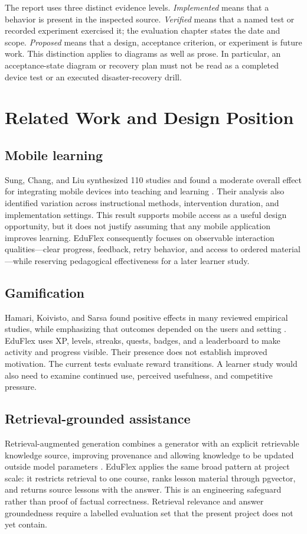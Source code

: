 \documentclass[12pt,a4paper,oneside]{report}
\begin{document}
The report uses three distinct evidence levels. \emph{Implemented} means that a
behavior is present in the inspected source. \emph{Verified} means that a named test
or recorded experiment exercised it; the evaluation chapter states the date and
scope. \emph{Proposed} means that a design, acceptance criterion, or experiment is
future work. This distinction applies to diagrams as well as prose. In particular,
an acceptance-state diagram or recovery plan must not be read as a completed device
test or an executed disaster-recovery drill.

\chapter{Related Work and Design Position}
\section{Mobile learning}
Sung, Chang, and Liu synthesized 110 studies and found a moderate overall effect for
integrating mobile devices into teaching and learning \cite{sung2016}. Their analysis
also identified variation across instructional methods, intervention duration, and
implementation settings. This result supports mobile access as a useful design
opportunity, but it does not justify assuming that any mobile application improves
learning. EduFlex consequently focuses on observable interaction qualities---clear
progress, feedback, retry behavior, and access to ordered material---while reserving
pedagogical effectiveness for a later learner study.

\section{Gamification}
Hamari, Koivisto, and Sarsa found positive effects in many reviewed empirical studies,
while emphasizing that outcomes depended on the users and setting
\cite{hamari2014}. EduFlex uses XP, levels, streaks, quests, badges, and a leaderboard
to make activity and progress visible. Their presence does not establish improved
motivation. The current tests evaluate reward transitions. A learner study would
also need to examine continued use, perceived usefulness, and competitive pressure.

\section{Retrieval-grounded assistance}
Retrieval-augmented generation combines a generator with an explicit retrievable
knowledge source, improving provenance and allowing knowledge to be updated outside
model parameters \cite{lewis2020}. EduFlex applies the same broad pattern at project
scale: it restricts retrieval to one course, ranks lesson material through pgvector,
and returns source lessons with the answer. This is an engineering safeguard rather
than proof of factual correctness. Retrieval relevance and answer groundedness require
a labelled evaluation set that the present project does not yet contain.
\end{document}
